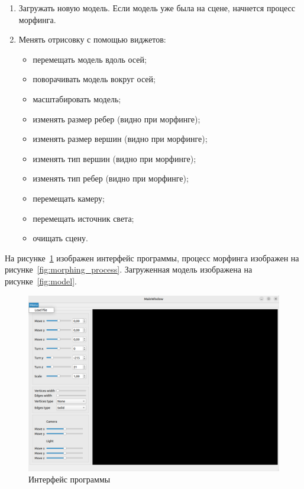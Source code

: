 \begin{enumerate}
	\item Загружать новую модель.
	Если модель уже была на сцене, начнется процесс морфинга.
	\item Менять отрисовку с помощью виджетов:
	
	\begin{itemize}
		\item перемещать модель вдоль осей;
		\item поворачивать модель вокруг осей;
		\item масштабировать модель;
		\item изменять размер ребер (видно при морфинге);
		\item изменять размер вершин (видно при морфинге);
		\item изменять тип вершин (видно при морфинге);
		\item изменять тип ребер (видно при морфинге);
		\item перемещать камеру;
		\item перемещать источник света;
		\item очищать сцену.
	\end{itemize}
\end{enumerate}

На рисунке~\ref{fig:interface} изображен интерфейс программы, процесс морфинга изображен на рисунке~\ref{fig:morphing_process}.
Загруженная модель изображена на рисунке~\ref{fig:model}.


\begin{figure}[h]
	\centering
	\includegraphics[scale=0.54]{images/interface_programm.png}
	\caption{Интерфейс программы}
	\label{fig:interface}
\end{figure}


